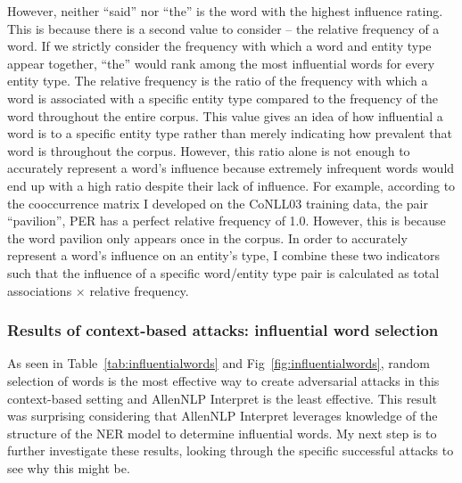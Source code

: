 However, neither ``said'' nor ``the'' is the word with the highest influence rating. This is because there is a second value to consider -- the relative frequency of a word. If we strictly consider the frequency with which a word and entity type appear together, ``the'' would rank among the most influential words for every entity type. The relative frequency is the ratio of the frequency with which a word is associated with a specific entity type compared to the frequency of the word throughout the entire corpus. This value gives an idea of how influential a word is to a specific entity type rather than merely indicating how prevalent that word is throughout the corpus. However, this ratio alone is not enough to accurately represent a word's influence because extremely infrequent words would end up with a high ratio despite their lack of influence. For example, according to the cooccurrence matrix I developed on the CoNLL03 training data, the pair ``pavilion'', \textsc{PER} has a perfect relative frequency of 1.0. However, this is because the word pavilion only appears once in the corpus. In order to accurately represent a word's influence on an entity's type, I combine these two indicators such that the influence of a specific word/entity type pair is calculated as total associations $\times$ relative frequency.

\subsubsection{Results of context-based attacks: influential word selection}
As seen in Table~\ref{tab:influentialwords} and Fig~\ref{fig:influentialwords}, random selection of words is the most effective way to create adversarial attacks in this context-based setting and AllenNLP Interpret is the least effective. This result was surprising considering that AllenNLP Interpret leverages knowledge of the structure of the NER model to determine influential words. My next step is to further investigate these results, looking through the specific successful attacks to see why this might be.

